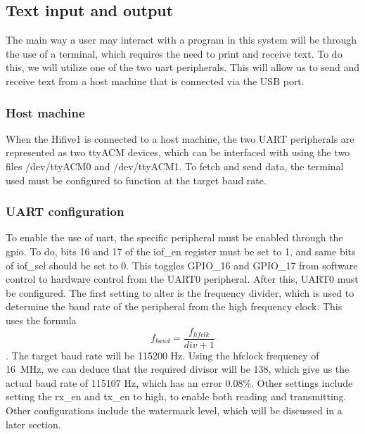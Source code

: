 \subsection{Text input and output}
The main way a user may interact with a program in this system will be through the use of a terminal, which requires the need to print and receive text. To do this, we will utilize one of the two \ac{uart} peripherals. This will allow us to send and receive text from a host machine that is connected via the USB port.
\subsubsection{Host machine}
When the Hifive1 is connected to a host machine, the two UART peripherals are represented as two ttyACM devices, which can be interfaced with using the two files /dev/ttyACM0 and /dev/ttyACM1. To fetch and send data, the terminal used must be configured to function at the target baud rate.
\subsubsection{UART configuration}
To enable the use of \ac{uart}, the specific peripheral must be enabled through the \ac{gpio}. To do, bits 16 and 17 of the iof\_en register must be set to 1, and same bits of iof\_sel should be set to 0. This toggles GPIO\_16 and GPIO\_17 from software control to hardware control from the UART0 peripheral. After this, UART0 must be configured. The first setting to alter is the frequency divider, which is used to determine the baud rate of the peripheral from the high frequency clock. This uses the formula \[f_{baud}=\frac{f_{hfclk}}{div+1}\]. The target baud rate will be 115200 Hz. Using the hfclock frequency of 16~MHz, we can deduce that the required divisor will be 138, which give us the actual baud rate of 115107 Hz, which has an error 0.08\%. Other settings include setting the rx\_en and tx\_en to high, to enable both reading and transmitting. Other configurations include the watermark level, which will be discussed in a later section.
